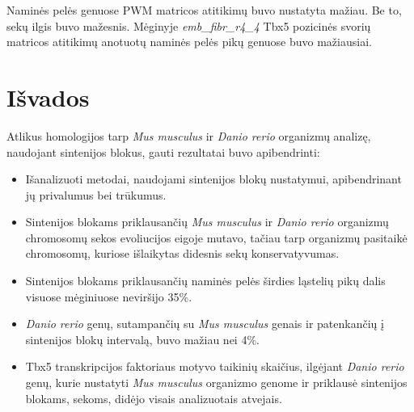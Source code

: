 \documentclass[12pt]{article}
\begin{document}
Naminės pelės genuose PWM matricos atitikimų buvo nustatyta mažiau. Be to, sekų
ilgis buvo mažesnis. Mėginyje \emph{emb\_fibr\_r4\_4} Tbx5 pozicinės svorių
matricos atitikimų anotuotų naminės pelės pikų genuose buvo mažiausiai.

\newpage


\section{Išvados}
Atlikus homologijos tarp \emph{Mus musculus} ir \emph{Danio rerio} organizmų
analizę, naudojant sintenijos blokus, gauti rezultatai buvo apibendrinti:

\begin{itemize}
    \item Išanalizuoti metodai, naudojami sintenijos blokų nustatymui,
          apibendrinant jų privalumus bei trūkumus.
    \item Sintenijos blokams priklausančių \emph{Mus musculus} ir
          \emph{Danio rerio} organizmų chromosomų sekos evoliucijos eigoje
          mutavo, tačiau tarp organizmų pasitaikė chromosomų, kuriose išlaikytas
          didesnis sekų konservatyvumas.
    \item Sintenijos blokams priklausančių naminės pelės širdies ląstelių pikų
          dalis visuose mėginiuose neviršijo 35\%.
    \item \emph{Danio rerio} genų, sutampančių su \emph{Mus musculus} genais ir
          patenkančių į sintenijos blokų intervalą, buvo mažiau nei 4\%.
    \item Tbx5 transkripcijos faktoriaus motyvo taikinių skaičius, ilgėjant
          \emph{Danio rerio} genų, kurie nustatyti \emph{Mus musculus}
          organizmo genome ir priklausė sintenijos blokams, sekoms, didėjo
          visais analizuotais atvejais.
\end{itemize}

\newpage

\end{document}
